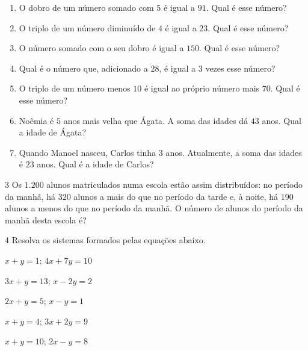 {\begin{enumerate}\def\labelenumi{\alph{enumi})}
\item O dobro de um número somado com $5$ é igual a $91$. Qual é esse número? 
\item O triplo de um número diminuído de $4$ é igual a $23$. Qual é esse número? 
\item O número somado com o seu dobro é igual a $150$. Qual é esse número? 
\item Qual é o número que, adicionado a $28$, é igual a $3$ vezes esse número? 
\item O triplo de um número menos $10$ é igual ao próprio número mais $70$. Qual é esse número? 
\item Noêmia é $5$ anos mais velha que Ágata. A soma das idades dá $43$ anos. Qual a idade de Ágata? 
\item Quando Manoel nasceu, Carlos tinha $3$ anos. Atualmente, a soma das idades é $23$ anos. Qual é a idade de Carlos? 
\end{enumerate}

\num{3}  Os $1.200$ alunos matriculados numa escola estão assim distribuídos: no
período da manhã, há $320$ alunos a mais do que no período da tarde e, à
noite, há $190$ alunos a menos do que no período da manhã. O número de
alunos do período da manhã desta escola é?


\num{4}  Resolva os sistemas formados pelas equações abaixo.

\begin{escolha}
\item $x + y = 1$; $4x + 7y = 10$ 
\item $3x + y = 13$; $x - 2y = 2$ 
\item $2x + y = 5$; $x - y = 1$ 
\item $x + y = 4$; $3x + 2y = 9$ 
\item $x + y = 10$; $2x - y = 8$ 
\end{escolha}


}
